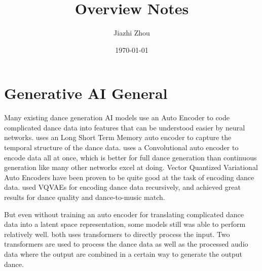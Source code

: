 \documentclass[11pt]{article}
\title{Overview Notes}
\author{Jiazhi Zhou}
\date{\today}
\begin{document}
\maketitle	

\section{Generative AI General}

Many existing dance generation AI models use an Auto Encoder to code complicated dance data into features that can be understood easier by neural networks. 
\cite{Tang2018} uses an Long Short Term Memory auto encoder to capture the temporal structure of the dance data.
\cite{Holden2016} uses a Convolutional auto encoder to encode data all at once, which is better for full dance generation than continuous generation like many other networks excel at doing.
Vector Quantized Variational Auto Encoders have been proven to be quite good at the task of encoding dance data. \cite{Yao2023,Siyao2023} used VQVAEs for encoding dance data recursively, and achieved great results for dance quality and dance-to-music match.


But even without training an auto encoder for translating complicated dance data into a latent space representation, some models still was able to perform relatively well. 
\cite{Li2020, Li2021} both uses transformers to directly process the input. Two transformers are used to process the dance data as well as the processed audio data where the output are combined in a certain way to generate the output dance.



\end{document}
